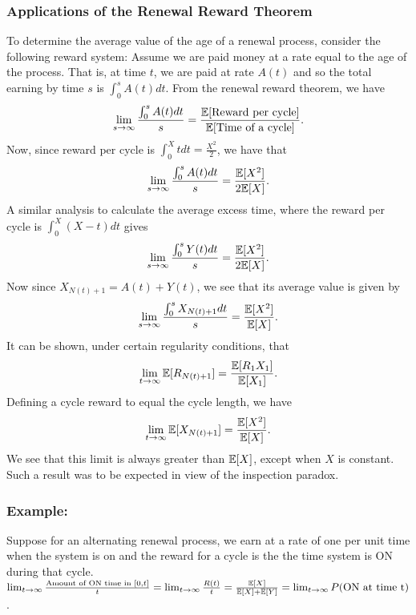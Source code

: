 \documentclass[a4paper,10pt,english]{article}
\begin{document}
\subsubsection{Applications of the Renewal Reward Theorem}
To determine the average value of the age of a renewal process, consider the following reward system: Assume we are paid money at a rate equal to the age of the process. That is, at time $t$, we are paid at rate $A(t)$ and so the total earning by time $s$ is $\int_0^s A(t)dt.$ From the renewal reward theorem, we have 
\begin{align*}
\lim_{s\to \infty}\frac{\int_0^s A(t)dt}{s} = \frac{\mathbb{E}[\text{Reward per cycle}]}{\mathbb{E}[\text{Time of a cycle}]}.
\end{align*}
Now, since reward per cycle is $\int_0^X t dt = \frac{X^2}{2}$, we have that
\begin{align*}
\lim_{s\to \infty}\frac{\int_0^s A(t)dt}{s} = \frac{\mathbb{E}[X^2]}{2\mathbb{E}[X]}.
\end{align*}
A similar analysis to calculate the average excess time, where the reward per cycle is $\int_0^X (X-t)dt$ gives 
\begin{align*}
\lim_{s\to \infty}\frac{\int_0^s Y(t)dt}{s} = \frac{\mathbb{E}[X^2]}{2\mathbb{E}[X]}.
\end{align*}
Now since $X_{N(t)+1}=A(t)+Y(t)$, we see that its average value is given by
\begin{align*}
\lim_{s\to \infty}\frac{\int_0^s X_{N(t)+1}dt}{s} = \frac{\mathbb{E}[X^2]}{\mathbb{E}[X]}.
\end{align*}
It can be shown, under certain regularity conditions, that 
\begin{align*}
\lim_{t\to \infty} \mathbb{E}[R_{N(t)+1}] = \frac{\mathbb{E}[R_1 X_1]}{\mathbb{E}[X_1]}.
\end{align*}
Defining a cycle reward to equal the cycle length, we have 
\begin{align*}
\lim_{t\to \infty} \mathbb{E}[X_{N(t)+1}] = \frac{\mathbb{E}[X^2]}{\mathbb{E}[X]}.
\end{align*}
We see that this limit is always greater than $\mathbb{E}[X]$, except when $X$ is constant. Such a result was to be expected in view of the inspection paradox.

 
 \subsubsection{Example:} Suppose for an alternating renewal process, we earn at a rate of one per unit time  when the system is on and the reward for a cycle is the the time system is ON during that cycle.\\
 $ \lim_{t \to \infty} \frac{\text{Amount of ON time in } [0,t]}{t} = \lim_{t \to \infty} \frac{R(t)}{t}=\frac{\mathbb{E}[X]}{\mathbb{E}[X]+\mathbb{E}[Y]} = \lim_{t \to \infty}P(\text{ON at time t})$. 
\end{document}
